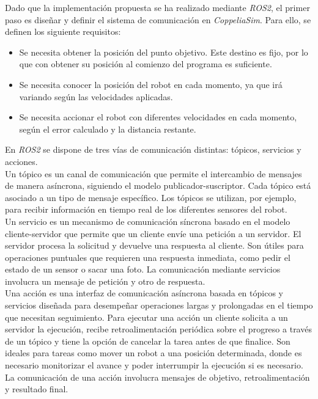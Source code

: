 Dado que la implementación propuesta se ha realizado mediante \textit{ROS2}, el primer paso es
diseñar y definir el sistema de comunicación en \textit{CoppeliaSim}. Para ello, se definen 
los siguiente requisitos:
\begin{itemize}
    \item Se necesita obtener la posición del punto objetivo. Este destino es fijo, 
    por lo que con obtener su posición al comienzo del programa es suficiente.
    \item Se necesita conocer la posición del robot en cada momento, ya que 
    irá variando según las velocidades aplicadas.
    \item Se necesita accionar el robot con diferentes velocidades en cada momento,
    según el error calculado y la distancia restante.
\end{itemize}

En \textit{ROS2} se dispone de tres vías de comunicación distintas: tópicos,
servicios y acciones. \\

Un tópico es un canal de comunicación que permite el intercambio de mensajes
de manera asíncrona, siguiendo el modelo publicador-suscriptor. Cada tópico está
asociado a un tipo de mensaje específico. Los tópicos se utilizan, por ejemplo,
para recibir información en tiempo real de los diferentes sensores del robot. \\

Un servicio es un mecanismo de comunicación síncrona basado en el modelo cliente-servidor
que permite que un cliente envíe una petición a un servidor. El servidor
procesa la solicitud y devuelve una respuesta al cliente. Son útiles para
operaciones puntuales que requieren una respuesta inmediata, como pedir el estado de
un sensor o sacar una foto. La comunicación mediante servicios involucra un mensaje de
petición y otro de respuesta. \\

Una acción es una interfaz de comunicación asíncrona basada en tópicos y servicios
diseñada para desempeñar operaciones largas y prolongadas en el tiempo que necesitan
seguimiento. Para ejecutar una acción un cliente solicita a un servidor la
ejecución, recibe retroalimentación periódica sobre el progreso a través de un tópico y
tiene la opción de cancelar la tarea antes de que finalice. Son ideales para tareas como
mover un robot a una posición determinada, donde es necesario monitorizar el avance y
poder interrumpir la ejecución si es necesario. La comunicación de una acción involucra
mensajes de objetivo, retroalimentación y resultado final. \\

